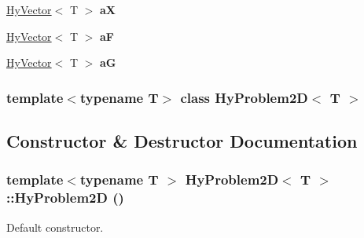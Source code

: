 \begin{DoxyCompactItemize}
\item 
\hypertarget{classHyProblem2D_af3d4f34732ec26825a2aa74a6fdd1f75}{
\hyperlink{classHyVector}{HyVector}$<$ T $>$ {\bfseries aX}}
\label{classHyProblem2D_af3d4f34732ec26825a2aa74a6fdd1f75}

\item 
\hypertarget{classHyProblem2D_acf8f18b879307b5df12f5e883aeb201b}{
\hyperlink{classHyVector}{HyVector}$<$ T $>$ {\bfseries aF}}
\label{classHyProblem2D_acf8f18b879307b5df12f5e883aeb201b}

\item 
\hypertarget{classHyProblem2D_a903b2b3dd93b65311f1f89dc8e51e032}{
\hyperlink{classHyVector}{HyVector}$<$ T $>$ {\bfseries aG}}
\label{classHyProblem2D_a903b2b3dd93b65311f1f89dc8e51e032}

\end{DoxyCompactItemize}
\subsubsection*{template$<$typename T$>$ class HyProblem2D$<$ T $>$}



\subsection{Constructor \& Destructor Documentation}
\hypertarget{classHyProblem2D_a116bb99c93f87c2c7446f27eaff92827}{
\subsubsection[{HyProblem2D}]{\setlength{\rightskip}{0pt plus 5cm}template$<$typename T $>$ {\bf HyProblem2D}$<$ T $>$::{\bf HyProblem2D} ()}}
\label{classHyProblem2D_a116bb99c93f87c2c7446f27eaff92827}


Default constructor. 


